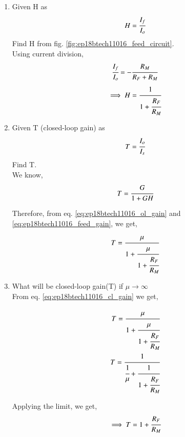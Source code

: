 \begin{enumerate}[label=\arabic*.,ref=\theenumi]

\item Given H as 
\begin{align}
    H = \cfrac{I_f}{I_o}
\end{align}
Find H from fig. \ref{fig:ep18btech11016_feed_circuit}.
\\
\solution Using current division,
\begin{align}
    \cfrac{I_f}{I_o} = -\cfrac{R_M}{R_F + R_M}
\end{align}
\begin{align}
    \implies H = \cfrac{1}{1 + \cfrac{R_F}{R_M}}
    \label{eq:ep18btech11016_feed_gain}
\end{align}


\item Given T (closed-loop gain) as
\begin{align}
    T = \cfrac{I_o}{I_s}
\end{align}
Find T.
\\
\solution We know, 
\begin{align}
    T = \cfrac{G}{1 + G H}
\end{align}

Therefore, from eq. \ref{eq:ep18btech11016_ol_gain} and \ref{eq:ep18btech11016_feed_gain}, we get,
\begin{align}
    T = \cfrac{\mu}{1 + \cfrac{\mu}{1 + \cfrac{R_F}{R_M}}}
    \label{eq:ep18btech11016_cl_gain}
\end{align}


\item What will be closed-loop gain(T) if $\mu \to \infty$
\\
\solution From eq. \ref{eq:ep18btech11016_cl_gain} we get,

\begin{align}
    T = \cfrac{\mu}{1 + \cfrac{\mu}{1 + \cfrac{R_F}{R_M}}}\\
    T = \cfrac{1}{\cfrac{1}{\mu} + \cfrac{1}{1 + \cfrac{R_F}{R_M}}}
\end{align}

Applying the limit, we get,
\begin{align}
    \implies T = 1 + \cfrac{R_F}{R_M}
\end{align}



\end{enumerate}
